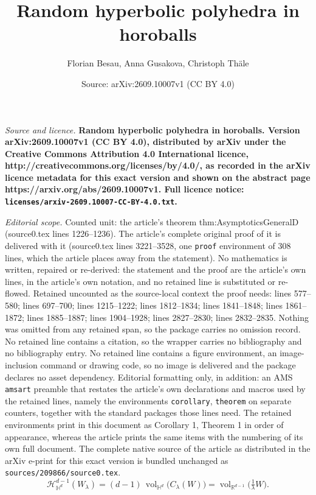 \documentclass[10pt,a4paper]{amsart}
\title{\bfseries Random hyperbolic polyhedra in horoballs}
\author{Florian Besau, Anna Gusakova, Christoph Th\"ale}
\date{Source: arXiv:2609.10007v1 (CC BY 4.0)}
\def\HH{\mathbb{H}}
\def\RR{\mathbb{R}}
\def\cH{\mathcal{H}}
\newcommand{\vol}{\mathop{\mathrm{vol}}\nolimits}
\begin{document}
\maketitle

\noindent\emph{Source and licence.} \bfseries Random hyperbolic polyhedra in horoballs. Version arXiv:2609.10007v1 (CC BY 4.0), distributed by arXiv under the Creative Commons Attribution 4.0 International licence, http://creativecommons.org/licenses/by/4.0/, as recorded in the arXiv licence metadata for this exact version and shown on the abstract page https://arxiv.org/abs/2609.10007v1. Full licence notice: \texttt{licenses/arxiv-2609.10007-CC-BY-4.0.txt}.\par\smallskip

\noindent\textit{Editorial scope.} Counted unit: the article's theorem thm:AsymptoticsGeneralD (source0.tex lines 1226--1236). The article's complete original proof of it is delivered with it (source0.tex lines 3221--3528, one \texttt{proof} environment of 308 lines, which the article places away from the statement). No mathematics is written, repaired or re-derived: the statement and the proof are the article's own lines, in the article's own notation, and no retained line is substituted or re-flowed.  Retained uncounted as the source-local context the proof needs: lines 577--580; lines 697--700; lines 1215--1222; lines 1812--1834; lines 1841--1848; lines 1861--1872; lines 1885--1887; lines 1904--1928; lines 2827--2830; lines 2832--2835.  Nothing was omitted from any retained span, so the package carries no omission record.  No retained line contains a citation, so the wrapper carries no bibliography and no bibliography entry.  No retained line contains a figure environment, an image-inclusion command or drawing code, so no image is delivered and the package declares no asset dependency.  Editorial formatting only, in addition: an AMS \texttt{amsart} preamble that restates the article's own declarations and macros used by the retained lines, namely the environments \texttt{corollary}, \texttt{theorem} on separate counters, together with the standard packages those lines need.  The retained environments print in this document as Corollary 1, Theorem 1 in order of appearance, whereas the article prints the same items with the numbering of its own full document.  The complete native source of the article as distributed in the arXiv e-print for this exact version is bundled unchanged as \texttt{sources/209866/source0.tex}.
\begin{equation}
	\label{eqn:VolumeCylinder}
	\cH_{\HH^d}^{d-1}(W_\lambda) = (d-1)\, \vol_{\HH^d}\bigl(C_\lambda(W)\bigr)  = \vol_{\RR^{d-1}}\bigl(\tfrac{1}{\lambda} W\bigr).
\end{equation}
\end{document}
